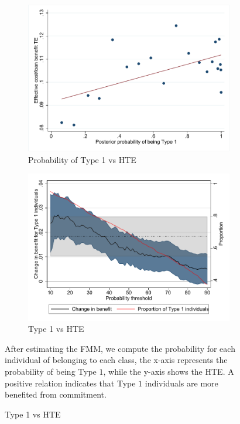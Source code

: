 \documentclass[oneside,11pt]{article}
\begin{document}
\begin{figure}[H]
    \caption{Treatment effect of Type 1 individuals}
    \label{fmm_hte}
    \begin{center}
    \begin{subfigure}{0.475\textwidth}       
            \caption{Probability of Type 1 vs HTE}
            \centering
        \includegraphics[width=\textwidth]{Figuras/binscatter_tau_classpost.pdf}
    \end{subfigure}
   \begin{subfigure}{0.475\textwidth}
        \caption{Type 1 vs HTE}
        \centering
        \includegraphics[width=\textwidth]{Figuras/benefit_type1p.pdf}
    \end{subfigure}
    \end{center}
     \scriptsize 
     After estimating the FMM, we compute the probability for each individual of belonging to each class, the x-axis represents the probability of being Type $1$, while the y-axis shows the HTE. A positive relation indicates that Type $1$ individuals are more benefited from commitment.
\end{figure}
\end{document}
